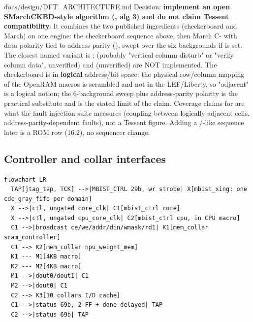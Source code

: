 \begin{relocated}{docs/design/DFT_ARCHITECTURE.md}
Decision: \textbf{implement an open SMarchCKBD-style algorithm
(, alg 3) and do not claim Tessent compatibility.} It
combines the two published ingredients (checkerboard and March) on one
engine: the checkerboard sequence above, then March C- with data
polarity tied to address parity (), swept over the six
backgrounds if  is set. The closest named variant is
;  (probably "vertical column disturb" or
"verify column data", unverified) and  (unverified) are NOT
implemented. The checkerboard is in \textbf{logical}
address/\allowbreak{}bit space: the physical row/\allowbreak{}column
mapping of the OpenRAM macros is scrambled and not in the
LEF/\allowbreak{}Liberty, so "adjacent" is a logical notion; the
6-background sweep plus address-parity polarity is the practical
substitute and is the stated limit of the claim. Coverage claims for
 are what the fault-injection suite measures (coupling
between logically adjacent cells, address-parity-dependent faults), not
a Tessent figure. Adding a /-like sequence later is
a ROM row (16.2), no sequencer change.

\subsection{Controller and collar interfaces}\label{tm:ch:dft-architecture:164-controller-and-collar-interfaces}

\begin{lstlisting}[language={},caption={Diagram source (Mermaid)}]
flowchart LR
  TAP[jtag_tap, TCK] -->|MBIST_CTRL 29b, wr strobe| X[mbist_xing: one cdc_gray_fifo per domain]
  X -->|ctl, ungated core_clk| C1[mbist_ctrl core]
  X -->|ctl, ungated cpu_core_clk| C2[mbist_ctrl cpu, in CPU macro]
  C1 -->|broadcast ce/we/addr/din/wmask/rd1| K1[mem_collar sram_controller]
  C1 --> K2[mem_collar npu_weight_mem]
  K1 --- M1[4KB macro]
  K2 --- M2[4KB macro]
  M1 -->|dout0/dout1| C1
  M2 -->|dout0| C1
  C2 --> K3[10 collars I/D cache]
  C1 -->|status 69b, 2-FF + done delayed| TAP
  C2 -->|status 69b| TAP
\end{lstlisting}


\end{relocated}
